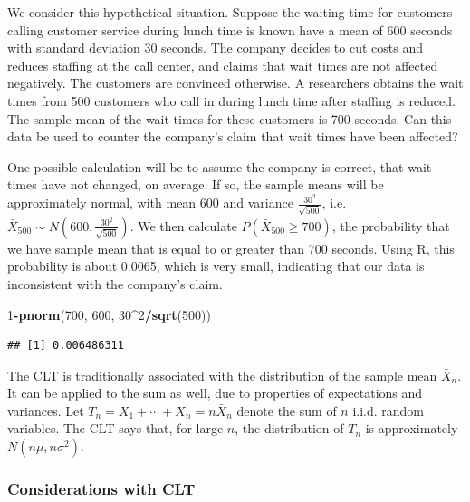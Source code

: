 \documentclass[
]{book}
\newenvironment{Shaded}{\begin{snugshade}}{\end{snugshade}}
\newcommand{\DecValTok}[1]{\textcolor[rgb]{0.00,0.00,0.81}{#1}}
\newcommand{\FunctionTok}[1]{\textcolor[rgb]{0.13,0.29,0.53}{\textbf{#1}}}
\newcommand{\NormalTok}[1]{#1}
\newcommand{\SpecialCharTok}[1]{\textcolor[rgb]{0.81,0.36,0.00}{\textbf{#1}}}
\begin{document}
We consider this hypothetical situation. Suppose the waiting time for customers calling customer service during lunch time is known have a mean of 600 seconds with standard deviation 30 seconds. The company decides to cut costs and reduces staffing at the call center, and claims that wait times are not affected negatively. The customers are convinced otherwise. A researchers obtains the wait times from 500 customers who call in during lunch time after staffing is reduced. The sample mean of the wait times for these customers is 700 seconds. Can this data be used to counter the company's claim that wait times have been affected?

One possible calculation will be to assume the company is correct, that wait times have not changed, on average. If so, the sample means will be approximately normal, with mean 600 and variance \(\frac{30^2}{\sqrt{500}}\), i.e.~\(\bar{X}_{500} \sim N(600, \frac{30^2}{\sqrt{500}})\). We then calculate \(P(\bar{X}_{500} \geq 700)\), the probability that we have sample mean that is equal to or greater than 700 seconds. Using R, this probability is about 0.0065, which is very small, indicating that our data is inconsistent with the company's claim.

\begin{Shaded}
\begin{Highlighting}[]
\DecValTok{1}\SpecialCharTok{{-}}\FunctionTok{pnorm}\NormalTok{(}\DecValTok{700}\NormalTok{, }\DecValTok{600}\NormalTok{, }\DecValTok{30}\SpecialCharTok{\^{}}\DecValTok{2}\SpecialCharTok{/}\FunctionTok{sqrt}\NormalTok{(}\DecValTok{500}\NormalTok{))}
\end{Highlighting}
\end{Shaded}

\begin{verbatim}
## [1] 0.006486311
\end{verbatim}

The CLT is traditionally associated with the distribution of the sample mean \(\bar{X}_n\). It can be applied to the sum as well, due to properties of expectations and variances. Let \(T_n = X_1 + \cdots + X_n = n \bar{X}_n\) denote the sum of \(n\) i.i.d. random variables. The CLT says that, for large \(n\), the distribution of \(T_n\) is approximately \(N(n\mu, n\sigma^2)\).

\subsubsection{Considerations with CLT}\label{considerCLT}
\end{document}

